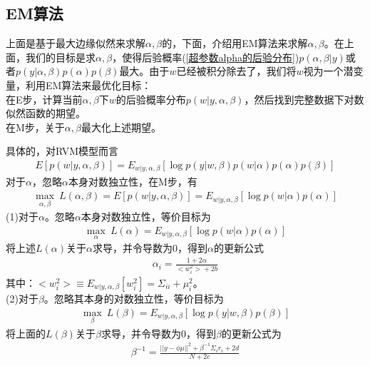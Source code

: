     \subsection{EM算法}
        \par
        上面是基于最大边缘似然来求解$\alpha,\beta$的，下面，介绍用EM算法来求解$\alpha,\beta$。在上面，我们的目标是求$\alpha,\beta$，使得后验概率(\ref{超参数alpha的后验分布})$p(\alpha,\beta|y)$或者$p(y|\alpha,\beta) p(\alpha) p(\beta)$最大。由于$w$已经被积分除去了，我们将$w$视为一个潜变量，利用EM算法来最优化目标：\\
        在E步，计算当前$\alpha,\beta$下$w$的后验概率分布$p(w|y,\alpha,\beta)$，然后找到完整数据下对数似然函数的期望。\\
        在M步，关于$\alpha,\beta$最大化上述期望。
        \par
        具体的，对RVM模型而言
        \begin{align*}
        E[p(w|y,\alpha,\beta)] = E_{w|y,\alpha,\beta}\left[ \log p(y|w,\beta)p(w|\alpha)p(\alpha)p(\beta) \right]
        \end{align*}
        对于$\alpha$，忽略$\alpha$本身对数独立性，在M步，有
        \begin{align*}
        \max_{\alpha,\beta}\ L(\alpha,\beta) = E[p(w|y,\alpha,\beta)] = E_{w|y,\alpha,\beta}[\log p(w|\alpha)p(\alpha)]
        \end{align*}
        (1)对于$\alpha$。忽略$\alpha$本身对数独立性，等价目标为
        \begin{align*}
        \max_\alpha \ L(\alpha) = E_{w|y,\alpha,\beta} [\log p(w|\alpha)p(\alpha)]
        \end{align*}
        将上述$L(\alpha)$关于$\alpha$求导，并令导数为0，得到$\alpha$的更新公式
        \begin{align*}
        \alpha_i = \frac{1+2\alpha}{\bigl<w_i^2\bigr>+ 2b}
        \end{align*}
        其中：$\bigl<w_i^2\bigr> \equiv E_{w|y,\alpha,\beta}[w_i^2] = \Sigma_{ii} + \mu_i^2$。\\
        (2)对于$\beta$。忽略其本身的对数独立性，等价目标为
        \begin{align*}
        \max_\beta \ L(\beta) = E_{w|y,\alpha,\beta} [\log p(y|w,\beta)p(\beta)]
        \end{align*}
        将上面的$L(\beta)$关于$\beta$求导，并令导数为0，得到$\beta$的更新公式为
        \begin{align*}
        \beta^{-1} = \frac{||y-\phi\mu||^2+ \beta^{-1}\Sigma_ir_i + 2d}{N+2c}
        \end{align*}
